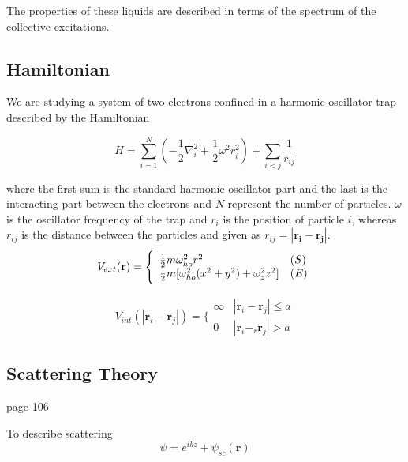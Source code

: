 The properties of these liquids are described in terms of the spectrum of the collective excitations.

\subsection{Hamiltonian}

We are studying a system of two electrons confined in a harmonic oscillator trap described by the Hamiltonian 

\begin{equation}\label{eq:hamilt_trap}
\hat{H} = \sum_{i=1}^N \left( - \frac{1}{2} \nabla_i^2 + \frac{1}{2} \omega^2 r_i^2 \right) + \sum_{i<j} \frac{1}{r_{ij}}
\end{equation}

where the first sum is the standard harmonic oscillator part and the last is the interacting part between the electrons and $N$ represent the number of particles. $\omega$ is the oscillator frequency of the trap and $r_i$ is the position of particle $i$, whereas $r_{ij}$ is the distance between the particles and given as $r_{ij} = |\mathbf{r_i} - \mathbf{r_j}|$. \\

\begin{equation} \label{eq:trap_potential}
 V_{ext}(\mathbf{r}) = 
 \Bigg\{
 \begin{array}{ll}
	 \frac{1}{2}m\omega_{ho}^2r^2 & (S)\\
 \strut
	 \frac{1}{2}m[\omega_{ho}^2(x^2+y^2) + \omega_z^2z^2] & (E)
 \end{array}
\end{equation}

\begin{equation} \label{eq:potential_internal}
 V_{int}(|\mathbf{r}_i-\mathbf{r}_j|) =  \Bigg\{
 \begin{array}{ll}
	 \infty & {|\mathbf{r}_i-\mathbf{r}_j|} \leq {a}\\
	 0 & {|\mathbf{r}_i-_r\mathbf{r}_j|} > {a}
 \end{array}
\end{equation}

\subsection{Scattering Theory}

page 106 

To describe scattering 
\begin{equation}
\psi =  e^{ikz} + \psi_{sc}(\textbf{r})
\end{equation}

